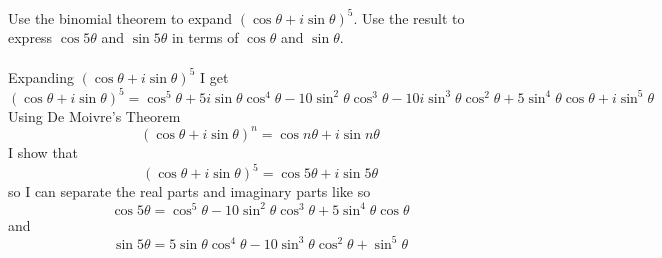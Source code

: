 \documentclass[titlepage]{article}
\newenvironment{problem}[2][Problem]{\begin{trivlist}
\item[\hskip \labelsep {\bfseries #1}\hskip \labelsep {\bfseries #2.}]}{\end{trivlist}}
\begin{document}
\begin{problem}{4}
Use the binomial theorem to expand $(\cos\theta+i\sin\theta)^5$. Use the result to express $\cos 5\theta$ and $\sin 5\theta$ in terms of $\cos\theta$ and $\sin\theta.$
\\ \\
Expanding $(\cos\theta+i\sin\theta)^5$ I get 
$$(\cos\theta+i\sin\theta)^5 = \cos^5{\theta} + 5i\sin{\theta}\cos^4{\theta} - 10\sin^2{\theta}\cos^3{\theta} - 10i\sin^3{\theta}\cos^2{\theta}+5\sin^4{\theta}\cos{\theta} +  i\sin^5{\theta}$$
Using De Moivre's Theorem
$$ (\cos\theta+i\sin\theta)^n = \cos n\theta+i\sin n\theta$$
I show that 
$$(\cos\theta+i\sin\theta)^5 = \cos 5\theta+i\sin 5\theta$$
so I can separate the real parts and imaginary parts like so
$$\cos{5\theta} = \cos^5{\theta} - 10\sin^2{\theta}\cos^3{\theta}+5\sin^4{\theta}\cos{\theta}$$
and 
$$\sin{5\theta} = 5\sin{\theta}\cos^4{\theta} - 10\sin^3{\theta}\cos^2{\theta}+ \sin^5{\theta}$$
\end{problem}
\end{document}

